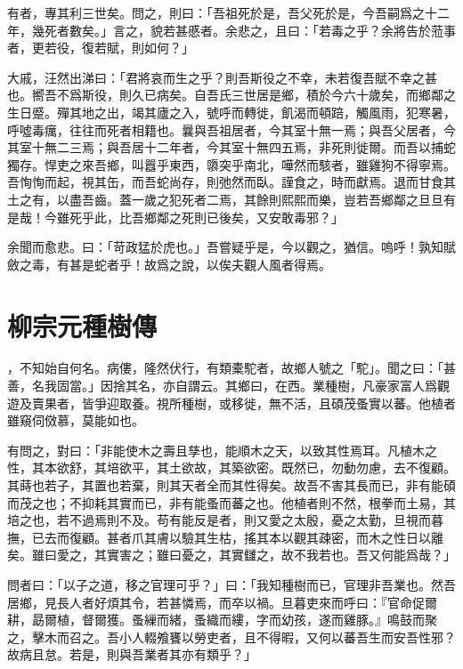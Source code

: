 有者，專其利三世矣。問之，則曰：「吾祖死於是，吾父死於是，今吾嗣爲之十二年，幾死者數矣。」言之，貌若甚{慼}者。余悲之，且曰：「若毒之乎？余將告於蒞事者，更若役，復若賦，則如何？」%

大{戚}，汪然出涕曰：「君將哀而生之乎？則吾斯役之不幸，未若復吾賦不幸之甚也。嚮吾不爲斯役，則久已病矣。自吾氏三世居是鄉，積於今六十歲矣，而鄉鄰之生日蹙。殫其地之出，竭其廬之入，號呼而轉徙，飢渴而頓踣，觸風雨，犯寒暑，呼噓毒癘，往往而死者相籍也。曩與吾祖居者，今其室十無一焉；與吾父居者，今其室十無二三焉；與吾居十二年者，今其室十無四五焉，非死則徙爾。而吾以捕蛇獨存。悍吏之來吾鄉，叫囂乎東西，隳突乎南北，嘩然而駭者，雖雞狗不得寧焉。吾恂恂而起，視其缶，而吾蛇尚存，則弛然而臥。謹食之，時而獻焉。退而甘食其土之有，以盡吾齒。蓋一歲之犯死者二焉，其餘則熙熙而樂，豈若吾鄉鄰之旦旦有是哉！今雖死乎此，比吾鄉鄰之死則已後矣，又安敢毒{邪}？」

余聞而愈悲。曰：「苛政猛於虎也。」吾嘗疑乎是，今以觀之，猶信。嗚呼！孰知賦斂之毒，有甚是蛇者乎！故爲之說，以俟夫觀人風者得焉。

\section[種樹郭橐駝傳\quad{\small 柳宗元}]{{\normalsize 柳宗元}\quad 種樹傳}
，不知始自何名。病僂，隆然伏行，有類橐駝者，故鄉人號之「駝」。聞之曰：「甚善，名我固當。」因捨其名，亦自謂云。其鄉曰，在西。業種樹，凡豪家富人爲觀遊及賣果者，皆爭迎取養。視所種樹，或{移}徙，無不活，且碩茂蚤實以蕃。他植者雖窺伺傚慕，莫能如也。

有問之，對曰：「非能使木之壽且孳也，能順木之天，以致其性焉耳。凡植木之性，其本欲舒，其培欲平，其土欲故，其築欲密。既然已，勿動勿慮，去不復顧。其蒔也若子，其置也若棄，則其天者全而其性得矣。故吾不害其長而已，非有能碩而茂之也；不抑耗其實而已，非有能蚤而蕃之也。他植者則不然，根拳而土易，其培之也，若不過焉則不及。苟有能反是者，則又愛之太殷，憂之太勤，旦視而暮撫，已去而復顧。甚者爪其膚以驗其生枯，搖其本以觀其疎密，而木之性日以離矣。雖曰愛之，其實害之；雖曰憂之，其實讎之，故不我若也。吾又何能爲哉？」

問者曰：「以子之道，移之官理可乎？」曰：「我知種樹而已，官理非吾業也。然吾居鄉，見長人者好煩其令，若甚憐焉，而卒以禍。旦暮吏來而呼曰：『官命促爾耕，勗爾植，督爾獲。蚤繅而緒，蚤織而縷，字而幼孩，遂而雞豚。』鳴鼓而聚之，擊木而召之。吾小人輟飧饔以勞吏者，且不得暇，又何以蕃吾生而安吾性邪？故病且怠。若是，則與吾業者其亦有類乎？」    

